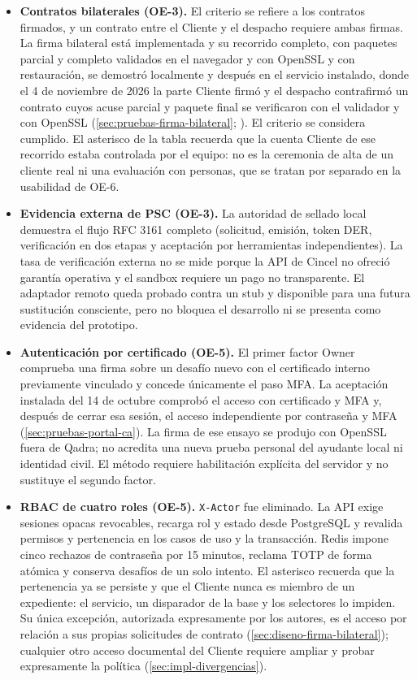 \begin{itemize}
  \item \textbf{Contratos bilaterales (OE-3).} El criterio se refiere a los contratos firmados, y un contrato entre el Cliente y el despacho requiere ambas firmas. La firma bilateral está implementada y su recorrido completo, con paquetes parcial y completo validados en el navegador y con OpenSSL y con restauración, se demostró localmente y después en el servicio instalado, donde el 4 de noviembre de 2026 la parte Cliente firmó y el despacho contrafirmó un contrato cuyos acuse parcial y paquete final se verificaron con el validador y con OpenSSL (\cref{sec:pruebas-firma-bilateral}; ). El criterio se considera cumplido. El asterisco de la tabla recuerda que la cuenta Cliente de ese recorrido estaba controlada por el equipo: no es la ceremonia de alta de un cliente real ni una evaluación con personas, que se tratan por separado en la usabilidad de OE-6.
  \item \textbf{Evidencia externa de PSC (OE-3).} La autoridad de sellado local demuestra el flujo RFC 3161 completo (solicitud, emisión, token DER, verificación en dos etapas y aceptación por herramientas independientes). La tasa de verificación externa no se mide porque la API de Cincel no ofreció garantía operativa y el sandbox requiere un pago no transparente. El adaptador remoto queda probado contra un stub y disponible para una futura sustitución consciente, pero no bloquea el desarrollo ni se presenta como evidencia del prototipo.
  \item \textbf{Autenticación por certificado (OE-5).} El primer factor Owner comprueba una firma sobre un desafío nuevo con el certificado interno previamente vinculado y concede únicamente el paso MFA. La aceptación instalada del 14 de octubre comprobó el acceso con certificado y MFA y, después de cerrar esa sesión, el acceso independiente por contraseña y MFA (\cref{sec:pruebas-portal-ca}). La firma de ese ensayo se produjo con OpenSSL fuera de Qadra; no acredita una nueva prueba personal del ayudante local ni identidad civil. El método requiere habilitación explícita del servidor y no sustituye el segundo factor.
  \item \textbf{RBAC de cuatro roles (OE-5).} \texttt{X-Actor} fue eliminado. La API exige sesiones opacas revocables, recarga rol y estado desde PostgreSQL y revalida permisos y pertenencia en los casos de uso y la transacción. Redis impone cinco rechazos de contraseña por 15 minutos, reclama TOTP de forma atómica y conserva desafíos de un solo intento. El asterisco recuerda que la pertenencia ya se persiste y que el Cliente nunca es miembro de un expediente: el servicio, un disparador de la base y los selectores lo impiden. Su única excepción, autorizada expresamente por los autores, es el acceso por relación a sus propias solicitudes de contrato (\cref{sec:diseno-firma-bilateral}); cualquier otro acceso documental del Cliente requiere ampliar y probar expresamente la política (\cref{sec:impl-divergencias}).

\end{itemize}
